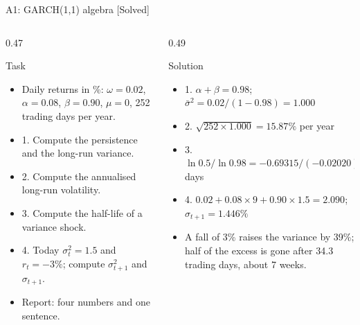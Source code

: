 \begin{frame}{A1: GARCH(1,1) algebra [Solved]}
\itemsize{\scriptsize}
\begin{columns}[T]
\begin{column}{0.47\textwidth}
\begin{block}{Task}
\begin{itemize}
    \item Daily returns in \%: $\omega = 0.02$, $\alpha = 0.08$, $\beta = 0.90$, $\mu = 0$, 252 trading days per year.
    \item 1. Compute the persistence and the long-run variance.
    \item 2. Compute the annualised long-run volatility.
    \item 3. Compute the half-life of a variance shock.
    \item 4. Today $\sigma_t^2 = 1.5$ and $r_t = -3\%$; compute $\sigma_{t+1}^2$ and $\sigma_{t+1}$.
    \item Report: four numbers and one sentence.
\end{itemize}
\end{block}
\end{column}
\begin{column}{0.49\textwidth}
\begin{exampleblock}{Solution}
\begin{itemize}
    \item 1. $\alpha + \beta = 0.98$; $\bar\sigma^2 = 0.02/(1 - 0.98) = 1.000$
    \item 2. $\sqrt{252 \times 1.000} = 15.87\%$ per year
    \item 3. $\ln 0.5/\ln 0.98 = -0.69315/(-0.02020) = 34.3$ days
    \item 4. $0.02 + 0.08 \times 9 + 0.90 \times 1.5 = 2.090$; $\sigma_{t+1} = 1.446\%$
    \item A fall of 3\% raises the variance by 39\%; half of the excess is gone after 34.3 trading days, about 7 weeks.
\end{itemize}
\end{exampleblock}
\end{column}
\end{columns}
\end{frame}

